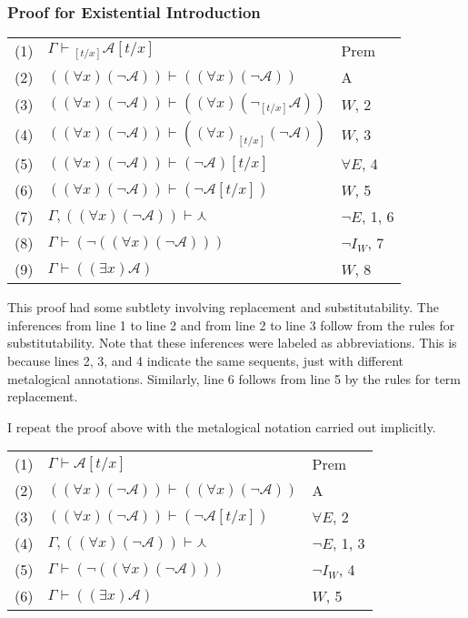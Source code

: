 \documentclass[12pt]{article}
\newcommand{\mc}[1]{\mathcal{#1}}
\begin{document}
\hrulefill

\subsubsection*{Proof for Existential Introduction}

\begin{center}
\begin{tabular}{ p{1cm} p{7cm} p{3cm} }
(1) & $\Gamma \vdash {_{[t/x]}\mc{A}}[t/x]$ & Prem\\
(2) & $((\forall x)(\lnot \mc{A})) \vdash ((\forall x)(\lnot \mc{A}))$ & A\\
(3) & $((\forall x)(\lnot \mc{A})) \vdash ((\forall x)(\lnot _{[t/x]}\mc{A}))$ & $W$, 2\\
(4) & $((\forall x)(\lnot \mc{A})) \vdash ((\forall x)_{[t/x]}(\lnot \mc{A}))$ & $W$, 3\\
(5) & $((\forall x)(\lnot \mc{A})) \vdash (\lnot \mc{A})[t/x]$ & $\forall E$, 4\\
(6) & $((\forall x)(\lnot \mc{A})) \vdash (\lnot \mc{A}[t/x])$ & $W$, 5\\
(7) & $\Gamma, ((\forall x)(\lnot \mc{A})) \vdash \curlywedge$ & $\lnot E$, 1, 6\\
(8) & $\Gamma \vdash (\lnot ((\forall x) (\lnot \mc{A})))$ & $\lnot I_W$, 7\\
(9) & $\Gamma \vdash ((\exists x) \mc{A})$ & $W$, 8
\end{tabular}
\end{center}

This proof had some subtlety involving replacement and substitutability.
The inferences from line 1 to line 2 and from line 2 to line 3 follow from the rules for substitutability.
Note that these inferences were labeled as abbreviations.
This is because lines 2, 3, and 4 indicate the same sequents, just with different metalogical annotations.
Similarly, line 6 follows from line 5 by the rules for term replacement.

I repeat the proof above with the metalogical notation carried out implicitly.

\begin{center}
\begin{tabular}{ p{1cm} p{7cm} p{3cm} }
(1) & $\Gamma \vdash \mc{A}[t/x]$ & Prem\\
(2) & $((\forall x)(\lnot \mc{A})) \vdash ((\forall x)(\lnot \mc{A}))$ & A\\
(3) & $((\forall x)(\lnot \mc{A})) \vdash (\lnot \mc{A}[t/x])$ & $\forall E$, 2\\
(4) & $\Gamma, ((\forall x)(\lnot \mc{A})) \vdash \curlywedge$ & $\lnot E$, 1, 3\\
(5) & $\Gamma \vdash (\lnot ((\forall x) (\lnot \mc{A})))$ & $\lnot I_W$, 4\\
(6) & $\Gamma \vdash ((\exists x) \mc{A})$ & $W$, 5
\end{tabular}
\end{center}
\end{document}
